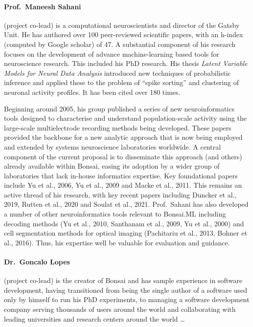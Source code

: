 \paragraph{Prof.~Maneesh Sahani} (project co-lead) is a computational
neuroscientists and director of the Gatsby Unit. He has authored over 100
peer-reviewed scientific papers, with an h-index (computed by Google scholar)
of 47. A substantial component of his research focuses on the development of
advance machine-learning based tools for neuroscience research. This included
his PhD research. His thesis \textit{Latent Variable Models for Neural Data
Analysis} introduced new techniques of probabilistic inference and applied
these to the problem of “spike sorting” and clustering of neuronal activity
profiles. It has been cited over 180 times.

Beginning around 2005, his group published a series of new neuroinformatics
tools designed to characterise and understand population-scale activity using
the large-scale multielectrode recording methods being developed. These papers
provided the backbone for a new analytic approach that is now being employed
and extended by systems neuroscience laboratories worldwide. A central
component of the current proposal is to disseminate this approach (and others)
already available within Bonsai, easing its adoption by a wider group of
laboratories that lack in-house informatics expertise. Key foundational papers
include Yu et al., 2006, Yu et al., 2009 and Macke et al., 2011.
%
This remains an active thread of his research, with key recent papers including
Duncker et al., 2019, Rutten et al., 2020 and Soulat et al., 2021.
%
Prof.~Sahani has also developed a number of other neuroinformatics tools
relevant to Bonsai.ML including decoding methods (Yu et al., 2010, Santhanam et
al., 2009, Yu et al., 2000) and cell segmentation methods for optical imaging
(Pachitariu et al., 2013, Bohner et al., 2016). Thus, his expertise well be
valuable for evaluation and guidance.

\paragraph{Dr.~Goncalo Lopes} (project co-lead) is the creator of Bonsai and
has sample experience in software development, having transitioned from being
the single author of a software used only by himself to run his PhD
experiments, to managing a software development company serving thousands of
users around the world and collaborating with leading universities and research
centers around the world \ldots

